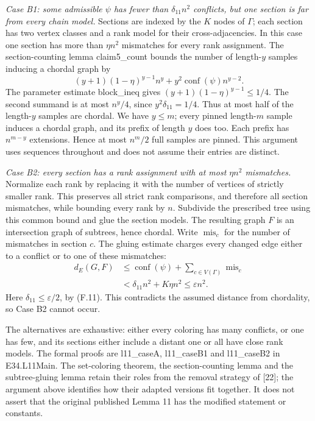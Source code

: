 \documentclass[english,11pt,a4paper]{article}
\begin{document}
\emph{Case B1: some admissible \(\psi\) has fewer than \(\delta_{11}n^2\) conflicts, but one section is far from every chain model.} Sections are indexed by the \(K\) nodes of \(\Gamma\); each section has two vertex classes and a rank model for their cross-adjacencies. In this case one section has more than \(\eta n^2\) mismatches for every rank assignment. The section-counting lemma {\ttfamily\small claim5\_\discretionary{\hbox{\ensuremath{\hookrightarrow}}}{}{}count} bounds the number of length-\(y\) samples inducing a chordal graph by \[
(y+1)(1-\eta)^{y-1}n^y+
y^2\operatorname{conf}(\psi)n^{y-2}.
\] The parameter estimate {\ttfamily\small block\_\discretionary{\hbox{\ensuremath{\hookrightarrow}}}{}{}ineq} gives \((y+1)(1-\eta)^{y-1}\le1/4\). The second summand is at most \(n^y/4\), since \(y^2\delta_{11}=1/4\). Thus at most half of the length-\(y\) samples are chordal. We have \(y\le m\); every pinned length-\(m\) sample induces a chordal graph, and its prefix of length \(y\) does too. Each prefix has \(n^{m-y}\) extensions. Hence at most \(n^m/2\) full samples are pinned. This argument uses sequences throughout and does not assume their entries are distinct.

\emph{Case B2: every section has a rank assignment with at most \(\eta n^2\) mismatches.} Normalize each rank by replacing it with the number of vertices of strictly smaller rank. This preserves all strict rank comparisons, and therefore all section mismatches, while bounding every rank by \(n\). Subdivide the prescribed tree using this common bound and glue the section models. The resulting graph \(F\) is an intersection graph of subtrees, hence chordal. Write \(\operatorname{mis}_c\) for the number of mismatches in section \(c\). The gluing estimate charges every changed edge either to a conflict or to one of these mismatches: \[
\begin{aligned}
d_E(G,F)&\le\operatorname{conf}(\psi)+
             \sum_{c\in V(\Gamma)}\operatorname{mis}_c\\
&<\delta_{11}n^2+K\eta n^2
\le\varepsilon n^2.
\end{aligned}
\tag{F.12}
\] Here \(\delta_{11}\le\varepsilon/2\), by (F.11). This contradicts the assumed distance from chordality, so Case B2 cannot occur.

The alternatives are exhaustive: either every coloring has many conflicts, or one has few, and its sections either include a distant one or all have close rank models. The formal proofs are {\ttfamily\small l11\_\discretionary{\hbox{\ensuremath{\hookrightarrow}}}{}{}caseA}, {\ttfamily\small l11\_\discretionary{\hbox{\ensuremath{\hookrightarrow}}}{}{}caseB1} and {\ttfamily\small l11\_\discretionary{\hbox{\ensuremath{\hookrightarrow}}}{}{}caseB2} in {\ttfamily\small E34.\discretionary{\hbox{\ensuremath{\hookrightarrow}}}{}{}L11Main}. The set-coloring theorem, the section-counting lemma and the subtree-gluing lemma retain their roles from the removal strategy of {[}22{]}; the argument above identifies how their adapted versions fit together. It does not assert that the original published Lemma 11 has the modified statement or constants.
\end{document}
